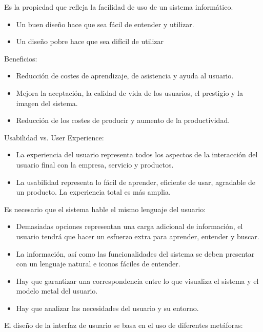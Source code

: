 \documentclass[12pt, twoside, openright]{report} %
\begin{document}
Es la propiedad que refleja la facilidad de uso de un sistema
informático.

\begin{itemize}
	\item Un buen diseño hace que sea fácil de entender y utilizar.
	\item Un diseño pobre hace que sea difícil de utilizar
\end{itemize}

Beneficios:

\begin{itemize}
	\item Reducción de costes de aprendizaje, de asistencia y ayuda al
	      usuario.
	\item Mejora la aceptación, la calidad de vida de los usuarios, el
	      prestigio y la imagen del sistema.
	\item Reducción de los costes de producir y aumento de la productividad.
\end{itemize}

Usabilidad vs. User Experience:

\begin{itemize}
	\item La experiencia del usuario representa todos los aspectos de la
	      interacción del usuario final con la empresa, servicio y
	      productos.
	\item La usabilidad representa lo fácil de aprender, eficiente de usar,
	      agradable de un producto. La experiencia total es más amplia.
\end{itemize}
\pagebreak
Es necesario que el sistema hable el mismo lenguaje del usuario:

\begin{itemize}
	\item Demasiadas opciones representan una carga adicional de
	      información, el usuario tendrá que hacer un esfuerzo extra para
	      aprender, entender y buscar.
	\item La información, así como las funcionalidades del sistema se deben
	      presentar con un lenguaje natural e iconos fáciles de entender.
	\item Hay que garantizar una correspondencia entre lo que visualiza el
	      sistema y el modelo metal del usuario.
	\item Hay que analizar las necesidades del usuario y su entorno.
\end{itemize}

El diseño de la interfaz de usuario se basa en el uso de diferentes
metáforas:
\end{document}
